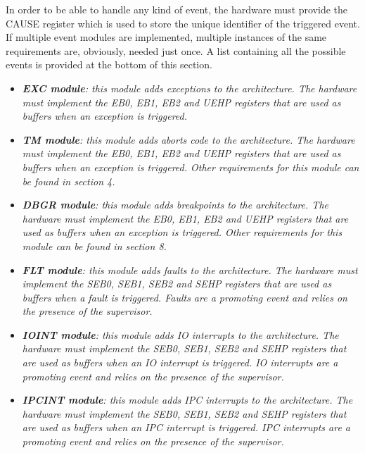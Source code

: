         In order to be able to handle any kind of event, the hardware must provide the CAUSE register which is used to store the unique identifier of the triggered event. If multiple event modules are implemented, multiple instances of the same requirements are, obviously, needed just once. A list containing all the possible events is provided at the bottom of this section.

        \begin{itemize}

            \item \textit{\textbf{EXC module}: this module adds exceptions to the architecture. The hardware must implement the EB0, EB1, EB2 and UEHP registers that are used as buffers when an exception is triggered.}

            \item \textit{\textbf{TM module}: this module adds aborts code to the architecture. The hardware must implement the EB0, EB1, EB2 and UEHP registers that are used as buffers when an exception is triggered. Other requirements for this module can be found in section 4.}

            \item \textit{\textbf{DBGR module}: this module adds breakpoints to the architecture. The hardware must implement the EB0, EB1, EB2 and UEHP registers that are used as buffers when an exception is triggered. Other requirements for this module can be found in section 8.}

            \item \textit{\textbf{FLT module}: this module adds faults to the architecture. The hardware must implement the SEB0, SEB1, SEB2 and SEHP registers that are used as buffers when a fault is triggered. Faults are a promoting event and relies on the presence of the supervisor.}

            \item \textit{\textbf{IOINT module}: this module adds IO interrupts to the architecture. The hardware must implement the SEB0, SEB1, SEB2 and SEHP registers that are used as buffers when an IO interrupt is triggered. IO interrupts are a promoting event and relies on the presence of the supervisor.}

            \item \textit{\textbf{IPCINT module}: this module adds IPC interrupts to the architecture. The hardware must implement the SEB0, SEB1, SEB2 and SEHP registers that are used as buffers when an IPC interrupt is triggered. IPC interrupts are a promoting event and relies on the presence of the supervisor.}

        \end{itemize}

